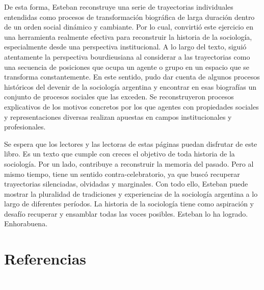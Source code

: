 De esta forma, Esteban reconstruye una serie de trayectorias individuales entendidas como procesos de transformación biográfica de larga duración dentro de un orden social dinámico y cambiante. Por lo cual, convirtió este ejercicio en una herramienta realmente efectiva para reconstruir la historia de la sociología, especialmente desde una perspectiva institucional. A lo largo del texto, siguió atentamente la perspectiva bourdieusiana al considerar a las trayectorias como una secuencia de posiciones que ocupa un agente o grupo en un espacio que se transforma constantemente. En este sentido, pudo dar cuenta de algunos procesos históricos del devenir de la sociología argentina y encontrar en esas biografías un conjunto de procesos sociales que las exceden. Se reconstruyeron procesos explicativos de los motivos concretos por los que agentes con propiedades sociales y representaciones diversas realizan apuestas en campos institucionales y profesionales.

Se espera que los lectores y las lectoras de estas páginas puedan disfrutar de este libro. Es un texto que cumple con creces el objetivo de toda historia de la sociología. Por un lado, contribuye a reconstruir la memoria del pasado. Pero al mismo tiempo, tiene un sentido contra-celebratorio, ya que buscó recuperar trayectorias silenciadas, olvidadas y marginales. Con todo ello, Esteban puede mostrar la pluralidad de tradiciones y experiencias de la sociología argentina a lo largo de diferentes períodos. La historia de la sociología tiene como aspiración y desafío recuperar y ensamblar todas las voces posibles. Esteban lo ha logrado. Enhorabuena.

\chapter[Referencias]{Referencias}
\printbibliography[heading=none]





\newpage
\pagestyle{empty}
{\textcolor{white}{.}}

